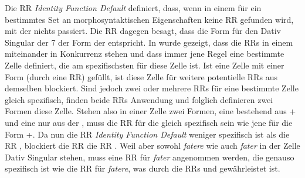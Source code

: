 Die RR \textit{Identity Function Default} definiert, dass, wenn in einem  für ein bestimmtes Set an morphosyntaktischen Eigenschaften keine RR gefunden wird, mit der  nichts passiert. Die RR  dagegen besagt, dass die Form für den Dativ Singular der  7 der Form der  entspricht. In  wurde gezeigt, dass die RRs in einem  miteinander in Konkurrenz stehen und dass immer jene Regel eine bestimmte Zelle definiert, die am spezifischsten für diese Zelle ist. Ist eine Zelle mit einer Form (durch eine RR) gefüllt, ist diese Zelle für weitere potentielle RRs aus demselben  blockiert. Sind jedoch zwei oder mehrere RRs für eine bestimmte Zelle gleich spezifisch, finden beide RRs Anwendung und folglich definieren zwei Formen diese Zelle. Stehen also in einer Zelle zwei Formen, eine bestehend aus + und eine nur aus der , muss die RR für die  gleich spezifisch sein wie jene für die Form +. Da nun die RR \textit{Identity Function Default}  weniger spezifisch ist als die RR , blockiert die RR  die RR . Weil aber sowohl \textit{fatere} wie auch \textit{fater} in der Zelle Dativ Singular stehen, muss eine RR für \textit{fater} angenommen werden, die genauso spezifisch ist wie die RR für \textit{fatere}, was durch die RRs  und  gewährleistet ist.

